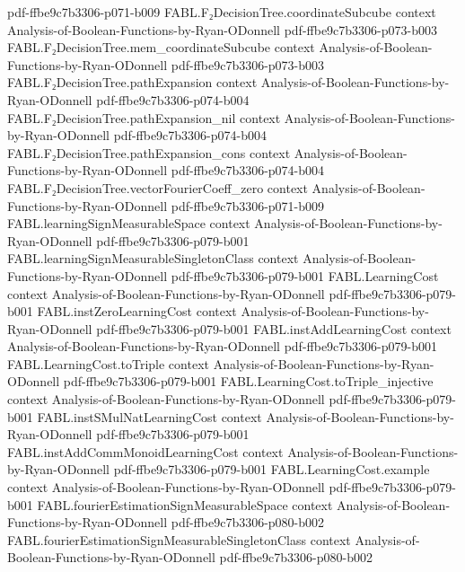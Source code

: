 \begin{theorem}
  {pdf-ffbe9c7b3306-p071-b009}
\proofstep
  {FABL.F₂DecisionTree.coordinateSubcube}
  {context}
  {Analysis-of-Boolean-Functions-by-Ryan-ODonnell}
  {pdf-ffbe9c7b3306-p073-b003}
\proofstep
  {FABL.F₂DecisionTree.mem_coordinateSubcube}
  {context}
  {Analysis-of-Boolean-Functions-by-Ryan-ODonnell}
  {pdf-ffbe9c7b3306-p073-b003}
\proofstep
  {FABL.F₂DecisionTree.pathExpansion}
  {context}
  {Analysis-of-Boolean-Functions-by-Ryan-ODonnell}
  {pdf-ffbe9c7b3306-p074-b004}
\proofstep
  {FABL.F₂DecisionTree.pathExpansion_nil}
  {context}
  {Analysis-of-Boolean-Functions-by-Ryan-ODonnell}
  {pdf-ffbe9c7b3306-p074-b004}
\proofstep
  {FABL.F₂DecisionTree.pathExpansion_cons}
  {context}
  {Analysis-of-Boolean-Functions-by-Ryan-ODonnell}
  {pdf-ffbe9c7b3306-p074-b004}
\proofstep
  {FABL.F₂DecisionTree.vectorFourierCoeff_zero}
  {context}
  {Analysis-of-Boolean-Functions-by-Ryan-ODonnell}
  {pdf-ffbe9c7b3306-p071-b009}
\proofstep
  {FABL.learningSignMeasurableSpace}
  {context}
  {Analysis-of-Boolean-Functions-by-Ryan-ODonnell}
  {pdf-ffbe9c7b3306-p079-b001}
\proofstep
  {FABL.learningSignMeasurableSingletonClass}
  {context}
  {Analysis-of-Boolean-Functions-by-Ryan-ODonnell}
  {pdf-ffbe9c7b3306-p079-b001}
\proofstep
  {FABL.LearningCost}
  {context}
  {Analysis-of-Boolean-Functions-by-Ryan-ODonnell}
  {pdf-ffbe9c7b3306-p079-b001}
\proofstep
  {FABL.instZeroLearningCost}
  {context}
  {Analysis-of-Boolean-Functions-by-Ryan-ODonnell}
  {pdf-ffbe9c7b3306-p079-b001}
\proofstep
  {FABL.instAddLearningCost}
  {context}
  {Analysis-of-Boolean-Functions-by-Ryan-ODonnell}
  {pdf-ffbe9c7b3306-p079-b001}
\proofstep
  {FABL.LearningCost.toTriple}
  {context}
  {Analysis-of-Boolean-Functions-by-Ryan-ODonnell}
  {pdf-ffbe9c7b3306-p079-b001}
\proofstep
  {FABL.LearningCost.toTriple_injective}
  {context}
  {Analysis-of-Boolean-Functions-by-Ryan-ODonnell}
  {pdf-ffbe9c7b3306-p079-b001}
\proofstep
  {FABL.instSMulNatLearningCost}
  {context}
  {Analysis-of-Boolean-Functions-by-Ryan-ODonnell}
  {pdf-ffbe9c7b3306-p079-b001}
\proofstep
  {FABL.instAddCommMonoidLearningCost}
  {context}
  {Analysis-of-Boolean-Functions-by-Ryan-ODonnell}
  {pdf-ffbe9c7b3306-p079-b001}
\proofstep
  {FABL.LearningCost.example}
  {context}
  {Analysis-of-Boolean-Functions-by-Ryan-ODonnell}
  {pdf-ffbe9c7b3306-p079-b001}
\proofstep
  {FABL.fourierEstimationSignMeasurableSpace}
  {context}
  {Analysis-of-Boolean-Functions-by-Ryan-ODonnell}
  {pdf-ffbe9c7b3306-p080-b002}
\proofstep
  {FABL.fourierEstimationSignMeasurableSingletonClass}
  {context}
  {Analysis-of-Boolean-Functions-by-Ryan-ODonnell}
  {pdf-ffbe9c7b3306-p080-b002}

\end{theorem}

